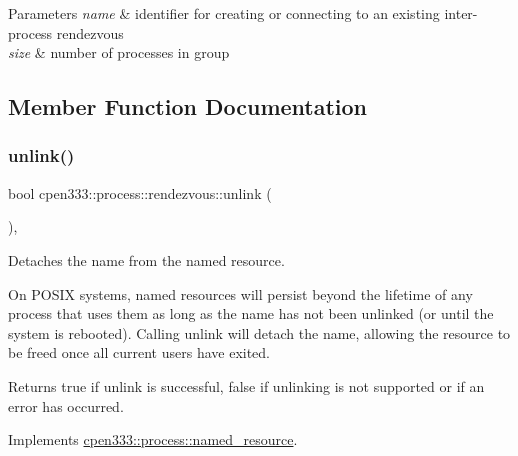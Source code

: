 \begin{DoxyParams}{Parameters}
{\em name} & identifier for creating or connecting to an existing inter-\/process rendezvous \\
\hline
{\em size} & number of processes in group \\
\hline
\end{DoxyParams}


\subsection{Member Function Documentation}
\mbox{\label{classcpen333_1_1process_1_1rendezvous_a458242e8ba600b0e638421825cbc9589}} 
\subsubsection{\texorpdfstring{unlink()}{unlink()}\hspace{0.1cm}{\footnotesize\ttfamily [1/2]}}
{\footnotesize\ttfamily bool cpen333\+::process\+::rendezvous\+::unlink (\begin{DoxyParamCaption}{ }\end{DoxyParamCaption})\hspace{0.3cm}{\ttfamily [inline]}, {\ttfamily [virtual]}}



Detaches the name from the named resource. 

On P\+O\+S\+IX systems, named resources will persist beyond the lifetime of any process that uses them as long as the name has not been unlinked (or until the system is rebooted). Calling {\ttfamily unlink} will detach the name, allowing the resource to be freed once all current users have exited.

\begin{DoxyReturn}{Returns}
{\ttfamily true} if unlink is successful, {\ttfamily false} if unlinking is not supported or if an error has occurred. 
\end{DoxyReturn}


Implements \hyperlink{classcpen333_1_1process_1_1named__resource_a5d33168fee48c9b0c58ab8fd96e230ce}{cpen333\+::process\+::named\+\_\+resource}.

\mbox{\label{classcpen333_1_1process_1_1rendezvous_afc91e654e867c785656182d1b4adc360}} 
